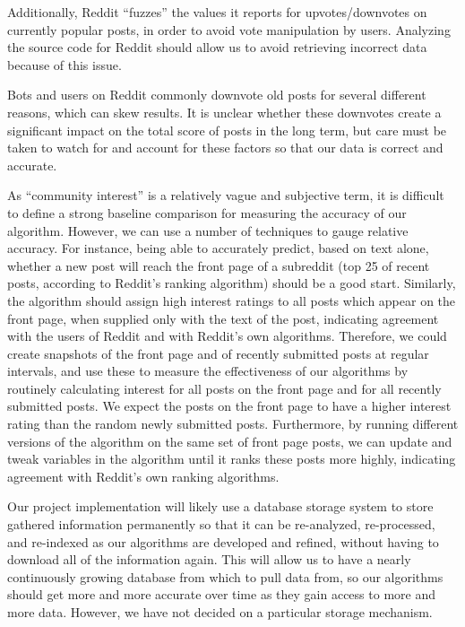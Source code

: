 \documentclass{acm_proc_article-sp}
\begin{document}
Additionally, Reddit ``fuzzes'' the values it reports for upvotes/downvotes on currently popular posts, in
order to avoid vote manipulation by users.  Analyzing the source code for Reddit should allow us to
avoid retrieving incorrect data because of this issue.

Bots and users on Reddit commonly downvote old posts for several different reasons, which can skew
results.  It is unclear whether these downvotes create a significant impact on the total score of
posts in the long term, but care must be taken to watch for and account for these factors so that
our data is correct and accurate.

As ``community interest'' is a relatively vague and subjective term, it is difficult to define a strong
baseline comparison for measuring the accuracy of our algorithm.  However, we can use a number of techniques
to gauge relative accuracy.  For instance, being able to accurately predict, based on text alone, whether a new post will reach the front
page of a subreddit (top 25 of recent posts, according to Reddit's ranking algorithm) should be a good
start.  Similarly, the algorithm should assign high interest ratings to all posts which appear on
the front page, when supplied only with the text of the post, indicating agreement with the users of
Reddit and with Reddit's own algorithms.  Therefore, we could create snapshots
of the front page and of recently submitted posts at regular intervals, and use these to measure
the effectiveness of our algorithms by routinely calculating interest for all posts on the front page
and for all recently submitted posts.  We expect the posts on the front page to have a higher interest
rating than the random newly submitted posts.  Furthermore, by running different versions of the algorithm
on the same set of front page posts, we can update and tweak variables in the algorithm until it ranks these
posts more highly, indicating agreement with Reddit's own ranking algorithms.

Our project implementation will likely use a database storage system to store
gathered information permanently so that it can be re-analyzed, re-processed, and re-indexed as
our algorithms are developed and refined, without having to download all of the information again.
This will allow us to have a nearly continuously growing database from which to pull data from, so
our algorithms should get more and more accurate over time as they gain access to more and more
data.  However, we have not decided on a particular storage mechanism.
\end{document}
